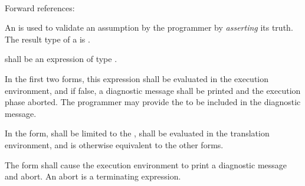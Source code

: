 
\begin{grammar}
 \\
	 \terminal{(}  \terminal{)} \\
	 \terminal{(}  \terminal{,}  \terminal{)} \\
	  \terminal{(}  \terminal{)} \\
	  \terminal{(}  \terminal{,}  \terminal{)} \\
	 \terminal{(} \terminal{)} \\
\end{grammar}

Forward references: 

\specsubsubitem
An  is used to validate an assumption by the
programmer by \textit{asserting} its truth. The result type of a
 is .

\specsubsubitem
{} shall be an expression of type
.

\specsubsubitem
In the first two forms, this expression shall be evaluated
in the execution environment, and if false, a diagnostic message shall be
printed and the execution phase aborted. The programmer may provide the
 to be included in the diagnostic message.

\specsubsubitem
In the  form,  shall be limited
to the , shall be evaluated
in the translation environment, and is otherwise equivalent to the other forms.

\specsubsubitem
The  form shall cause the execution environment to print a
diagnostic message and abort. An abort is a terminating expression.


